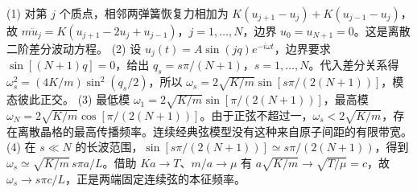 (1) 对第 \(j\) 个质点，相邻两弹簧恢复力相加为 \(K(u_{j+1}-u_j)+K(u_{j-1}-u_j)\)，故 \(m\ddot u_j=K(u_{j+1}-2u_j+u_{j-1})\)，\(j=1,\dots,N\)，边界 \(u_0=u_{N+1}=0\)。这是离散二阶差分波动方程。
(2) 设 \(u_j(t)=A\sin(jq)e^{-i\omega t}\)，边界要求 \(\sin[(N+1)q]=0\)，给出 \(q_s=s\pi/(N+1)\)，\(s=1,\ldots,N\)。代入差分关系得 \(\omega_s^2=(4K/m)\sin^2(q_s/2)\)，所以 \(\omega_s=2\sqrt{K/m}\sin[s\pi/(2(N+1))]\)，模态彼此正交。
(3) 最低模 \(\omega_1=2\sqrt{K/m}\sin[\pi/(2(N+1))]\)，最高模 \(\omega_N=2\sqrt{K/m}\cos[\pi/(2(N+1))]\)。由于正弦不超过一，\(\omega_s<2\sqrt{K/m}\)，存在离散晶格的最高传播频率。连续经典弦模型没有这种来自原子间距的有限带宽。
(4) 在 \(s\ll N\) 的长波范围，\(\sin[s\pi/(2(N+1))]\simeq s\pi/(2(N+1))\)，得到 \(\omega_s\simeq\sqrt{K/m}\,s\pi a/L\)。借助 \(Ka\to T\)、\(m/a\to\mu\) 有 \(a\sqrt{K/m}\to\sqrt{T/\mu}=c\)，故 \(\omega_s\to s\pi c/L\)，正是两端固定连续弦的本征频率。
